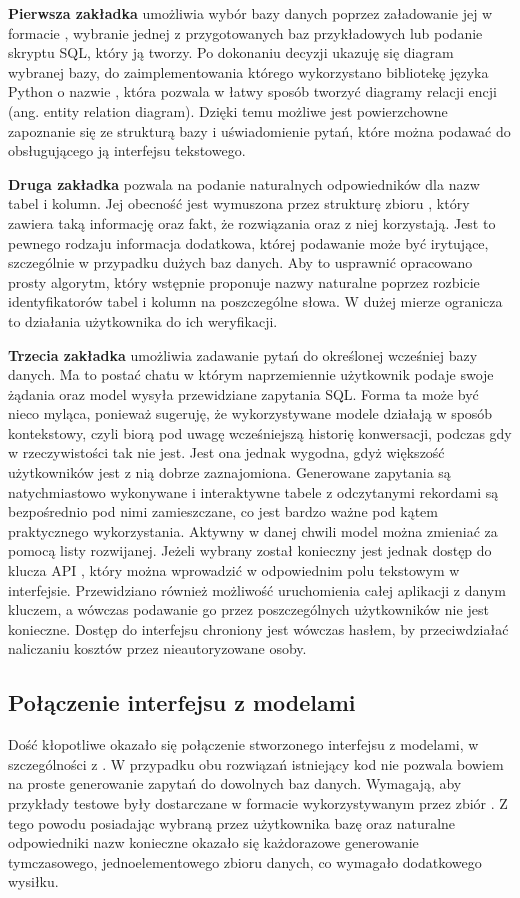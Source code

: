 \textbf{Pierwsza zakładka} umożliwia wybór bazy danych poprzez załadowanie jej w formacie , wybranie jednej z przygotowanych baz przykładowych lub podanie skryptu SQL, który ją tworzy. Po dokonaniu decyzji ukazuję się diagram wybranej bazy, do zaimplementowania którego wykorzystano bibliotekę języka Python o nazwie , która pozwala w łatwy sposób tworzyć diagramy relacji encji (ang. entity relation diagram). Dzięki temu możliwe jest powierzchowne zapoznanie się ze strukturą bazy i uświadomienie pytań, które można podawać do obsługującego ją interfejsu tekstowego.

\textbf{Druga zakładka} pozwala na podanie naturalnych odpowiedników dla nazw tabel i kolumn. Jej obecność jest wymuszona przez strukturę zbioru , który zawiera taką informację oraz fakt, że rozwiązania  oraz  z niej korzystają. Jest to pewnego rodzaju informacja dodatkowa, której podawanie może być irytujące, szczególnie w przypadku dużych baz danych. Aby to usprawnić opracowano prosty algorytm, który wstępnie proponuje nazwy naturalne poprzez rozbicie identyfikatorów tabel i kolumn na poszczególne słowa. W dużej mierze ogranicza to działania użytkownika do ich weryfikacji.

\textbf{Trzecia zakładka} umożliwia zadawanie pytań do określonej wcześniej bazy danych. Ma to postać chatu w którym naprzemiennie użytkownik podaje swoje żądania oraz model wysyła przewidziane zapytania SQL. Forma ta może być nieco myląca, ponieważ sugeruję, że wykorzystywane modele działają w sposób kontekstowy, czyli biorą pod uwagę wcześniejszą historię konwersacji, podczas gdy w rzeczywistości tak nie jest. Jest ona jednak wygodna, gdyż większość użytkowników jest z nią dobrze zaznajomiona. Generowane zapytania są natychmiastowo wykonywane i interaktywne tabele z odczytanymi rekordami są bezpośrednio pod nimi zamieszczane, co jest bardzo ważne pod kątem praktycznego wykorzystania. Aktywny w danej chwili model można zmieniać za pomocą listy rozwijanej. Jeżeli wybrany został  konieczny jest jednak dostęp do klucza API , który można wprowadzić w odpowiednim polu tekstowym w interfejsie. Przewidziano również możliwość uruchomienia całej aplikacji z danym kluczem, a wówczas podawanie go przez poszczególnych użytkowników nie jest konieczne. Dostęp do interfejsu chroniony jest wówczas hasłem, by przeciwdziałać naliczaniu kosztów przez nieautoryzowane osoby.

\subsection{Połączenie interfejsu z modelami}
Dość kłopotliwe okazało się połączenie stworzonego interfejsu z modelami, w szczególności z . W przypadku obu rozwiązań istniejący kod nie pozwala bowiem na proste generowanie zapytań do dowolnych baz danych. Wymagają, aby przykłady testowe były dostarczane w formacie wykorzystywanym przez zbiór . Z tego powodu posiadając wybraną przez użytkownika bazę oraz naturalne odpowiedniki nazw konieczne okazało się każdorazowe generowanie tymczasowego, jednoelementowego zbioru danych, co wymagało dodatkowego wysiłku.

